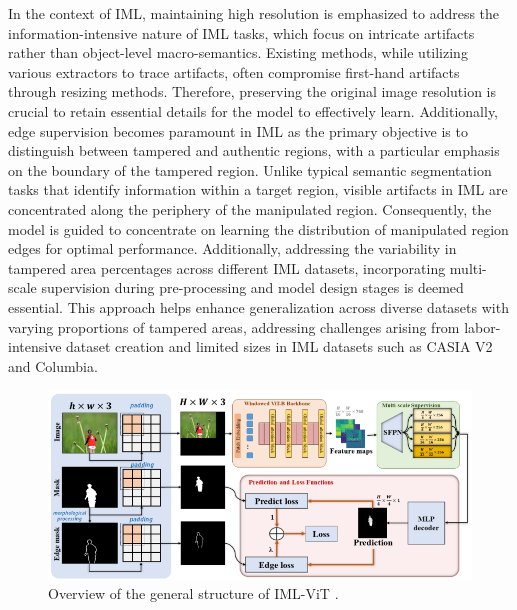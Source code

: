 In the context of IML, maintaining high resolution is emphasized to address the information-intensive nature of IML tasks, which focus on intricate artifacts rather than object-level macro-semantics. Existing methods, while utilizing various extractors to trace artifacts, often compromise first-hand artifacts through resizing methods. Therefore, preserving the original image resolution is crucial to retain essential details for the model to effectively learn. Additionally, edge supervision becomes paramount in IML as the primary objective is to distinguish between tampered and authentic regions, with a particular emphasis on the boundary of the tampered region. Unlike typical semantic segmentation tasks that identify information within a target region, visible artifacts in IML are concentrated along the periphery of the manipulated region. Consequently, the model is guided to concentrate on learning the distribution of manipulated region edges for optimal performance. Additionally, addressing the variability in tampered area percentages across different IML datasets, incorporating multi-scale supervision during pre-processing and model design stages is deemed essential. This approach helps enhance generalization across diverse datasets with varying proportions of tampered areas, addressing challenges arising from labor-intensive dataset creation and limited sizes in IML datasets such as CASIA V2 and Columbia.

\begin{figure}[!h]
    \centering
    \includegraphics[width=0.75\linewidth]{IMLViT.png}
    \caption{Overview of the general structure of IML-ViT \cite{ma2023imlvit}.}
    \label{fig:imlVIT}
\end{figure}


